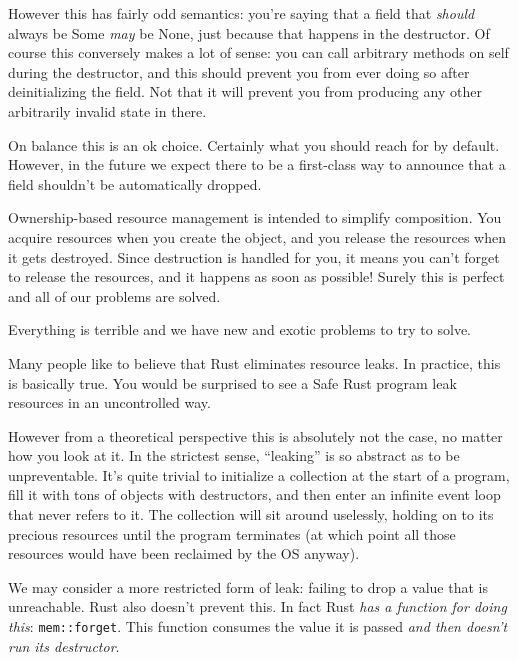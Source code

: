\documentclass[a4paper,]{book}
\begin{document}
However this has fairly odd semantics: you're saying that a field that
\emph{should} always be Some \emph{may} be None, just because that
happens in the destructor. Of course this conversely makes a lot of
sense: you can call arbitrary methods on self during the destructor, and
this should prevent you from ever doing so after deinitializing the
field. Not that it will prevent you from producing any other arbitrarily
invalid state in there.

On balance this is an ok choice. Certainly what you should reach for by
default. However, in the future we expect there to be a first-class way
to announce that a field shouldn't be automatically dropped.


Ownership-based resource management is intended to simplify composition.
You acquire resources when you create the object, and you release the
resources when it gets destroyed. Since destruction is handled for you,
it means you can't forget to release the resources, and it happens as
soon as possible! Surely this is perfect and all of our problems are
solved.

Everything is terrible and we have new and exotic problems to try to
solve.

Many people like to believe that Rust eliminates resource leaks. In
practice, this is basically true. You would be surprised to see a Safe
Rust program leak resources in an uncontrolled way.

However from a theoretical perspective this is absolutely not the case,
no matter how you look at it. In the strictest sense, ``leaking'' is so
abstract as to be unpreventable. It's quite trivial to initialize a
collection at the start of a program, fill it with tons of objects with
destructors, and then enter an infinite event loop that never refers to
it. The collection will sit around uselessly, holding on to its precious
resources until the program terminates (at which point all those
resources would have been reclaimed by the OS anyway).

We may consider a more restricted form of leak: failing to drop a value
that is unreachable. Rust also doesn't prevent this. In fact Rust
\emph{has a function for doing this}: \texttt{mem::forget}. This
function consumes the value it is passed \emph{and then doesn't run its
destructor}.
\end{document}
